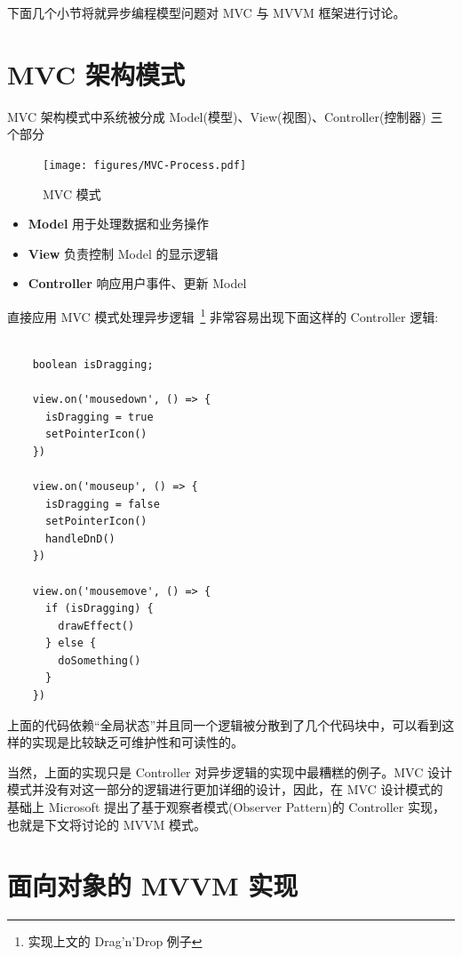下面几个小节将就异步编程模型问题对 MVC 与 MVVM 框架进行讨论。

\section{MVC 架构模式}

MVC 架构模式中系统被分成 Model(模型)、View(视图)、Controller(控制器) 三个部分

\begin{figure}[!h]
  \begin{center}
    \texttt{[image: figures/MVC-Process.pdf]}
    \caption{MVC 模式}
  \end{center}
\end{figure}

\begin{itemize}
  \item \textbf{Model} 用于处理数据和业务操作
  \item \textbf{View} 负责控制 Model 的显示逻辑
  \item \textbf{Controller} 响应用户事件、更新 Model
\end{itemize}

直接应用 MVC 模式处理异步逻辑~\footnote{实现上文的 Drag'n'Drop 例子} 非常容易出现下面这样的 Controller 逻辑:

\begin{verbatim}

    boolean isDragging;

    view.on('mousedown', () => {
      isDragging = true
      setPointerIcon()
    })

    view.on('mouseup', () => {
      isDragging = false
      setPointerIcon()
      handleDnD()
    })

    view.on('mousemove', () => {
      if (isDragging) {
        drawEffect()
      } else {
        doSomething()
      }
    })

\end{verbatim}

上面的代码依赖“全局状态”并且同一个逻辑被分散到了几个代码块中，可以看到这样的实现是比较缺乏可维护性和可读性的。

当然，上面的实现只是 Controller 对异步逻辑的实现中最糟糕的例子。MVC 设计模式并没有对这一部分的逻辑进行更加详细的设计，因此，在 MVC 设计模式的基础上 Microsoft 提出了基于观察者模式(Observer Pattern)的 Controller 实现，也就是下文将讨论的 MVVM 模式。

\section{面向对象的 MVVM 实现}

